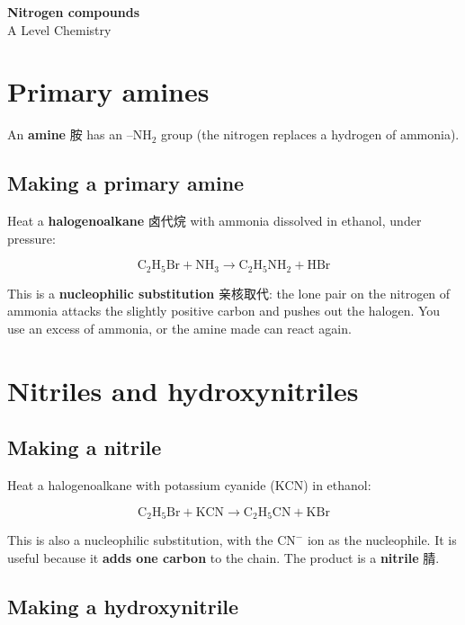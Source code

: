 \documentclass[11pt]{article}
\begin{document}
\begin{center}
  {\LARGE\bfseries Nitrogen compounds}\\[0.35em]
  {\large A Level Chemistry}
\end{center}
\vspace{0.6em}

\section*{Primary amines}

An \textbf{amine} 胺 has an $\text{–NH}_2$ group (the nitrogen replaces a hydrogen of ammonia).

\subsection*{Making a primary amine}

Heat a \textbf{halogenoalkane} 卤代烷 with ammonia dissolved in ethanol, under pressure:

\[
\text{C}_2\text{H}_5\text{Br} + \text{NH}_3 \rightarrow \text{C}_2\text{H}_5\text{NH}_2 + \text{HBr}
\]

This is a \textbf{nucleophilic substitution} 亲核取代: the lone pair on the nitrogen of ammonia attacks the slightly positive carbon and pushes out the halogen. You use an excess of ammonia, or the amine made can react again.

\section*{Nitriles and hydroxynitriles}

\subsection*{Making a nitrile}

Heat a halogenoalkane with potassium cyanide ($\text{KCN}$) in ethanol:

\[
\text{C}_2\text{H}_5\text{Br} + \text{KCN} \rightarrow \text{C}_2\text{H}_5\text{CN} + \text{KBr}
\]

This is also a nucleophilic substitution, with the $\text{CN}^-$ ion as the nucleophile. It is useful because it \textbf{adds one carbon} to the chain. The product is a \textbf{nitrile} 腈.

\subsection*{Making a hydroxynitrile}
\end{document}
